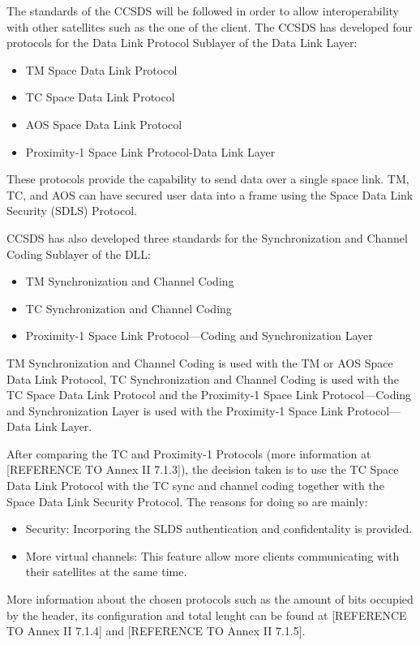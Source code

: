 The standards of the CCSDS will be followed in order to allow interoperability with other satellites such as the one of the client. The CCSDS has developed four protocols for the Data Link Protocol Sublayer of the Data Link Layer\cite{Secretariat2014}:

\begin{itemize}
\item TM Space Data Link Protocol
\item TC Space Data Link Protocol
\item AOS Space Data Link Protocol
\item Proximity-1 Space Link Protocol-Data Link Layer
\end{itemize}

These protocols provide the capability to send data over a single space link. TM, TC, and AOS can have secured user data into a frame using the Space Data Link Security (SDLS) Protocol.

CCSDS has also developed three standards for the Synchronization and Channel Coding Sublayer of the DLL:
\begin{itemize}
\item TM Synchronization and Channel Coding
\item TC Synchronization and Channel Coding
\item Proximity-1 Space Link Protocol—Coding and Synchronization Layer
\end{itemize}

TM Synchronization and Channel Coding is used with the TM or AOS Space Data Link Protocol, TC Synchronization and Channel Coding is used with the TC Space Data Link Protocol and the Proximity-1 Space Link Protocol—Coding and Synchronization Layer is used with the Proximity-1 Space Link Protocol—Data Link Layer. 

After comparing the TC and Proximity-1 Protocols (more information at [REFERENCE TO Annex II 7.1.3]), the decision taken is to use the TC Space Data Link Protocol with the TC sync and channel coding together with the Space Data Link Security Protocol. The reasons for doing so are mainly:

\begin{itemize}
\item Security: Incorporing the SLDS authentication and confidentality is provided.
\item More virtual channels: This feature allow more clients communicating with their satellites at the same time.
\end{itemize}

More information about the chosen protocols such as the amount of bits occupied by the header, its configuration and total lenght can be found at [REFERENCE TO Annex II 7.1.4] and [REFERENCE TO Annex II 7.1.5].